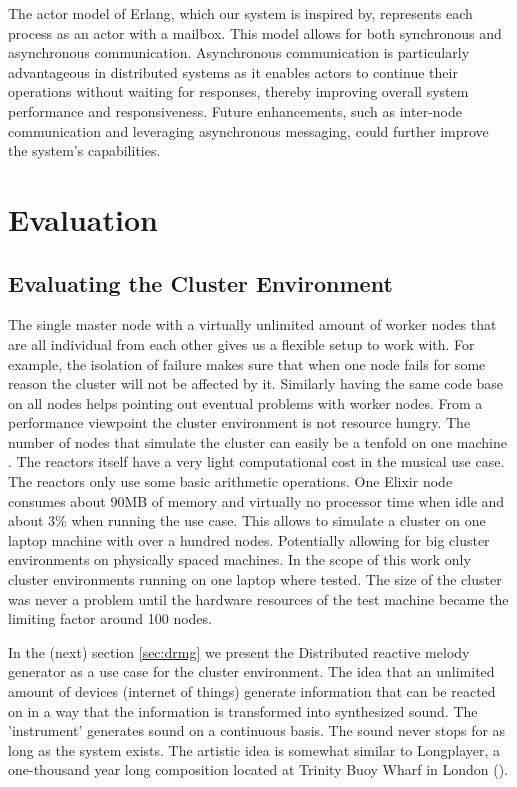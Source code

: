 \documentclass[a4paper]{book}
\begin{document}
The actor model of Erlang, which our system is inspired by, represents each process as an actor with a mailbox. This model allows for both synchronous and asynchronous communication. Asynchronous communication is particularly advantageous in distributed systems as it enables actors to continue their operations without waiting for responses, thereby improving overall system performance and responsiveness. Future enhancements, such as inter-node communication and leveraging asynchronous messaging, could further improve the system's capabilities.

\chapter{Evaluation} \label{sec:evaluation}


\section{Evaluating the Cluster Environment}

The single master node with a virtually unlimited amount of worker nodes that are all individual from each other gives us a flexible setup to work with. For example, the isolation of failure makes sure that when one node fails for some reason the cluster will not be affected by it. Similarly having the same code base on all nodes helps pointing out eventual problems with worker nodes. From a performance viewpoint the cluster environment is not resource hungry. The number of nodes that simulate the cluster can easily be a tenfold on one machine . The reactors itself have a very light computational cost in the musical use case. The reactors only use some basic arithmetic operations. One Elixir node consumes about 90MB of memory and virtually no processor time when idle and about 3\% when running the use case. This allows to simulate a cluster on one laptop machine with over a hundred nodes. Potentially allowing for big cluster environments on physically spaced machines. In the scope of this work only cluster environments running on one laptop where tested. The size of the cluster was never a problem until the hardware resources of the test machine became the limiting factor around 100 nodes.

In the (next) section \ref{sec:drmg} we present the Distributed reactive melody generator as a use case for the cluster environment. The idea that an unlimited amount of devices (internet of things) generate information that can be reacted on in a way that the information is transformed into synthesized sound. The 'instrument' generates sound on a continuous basis. The sound never stops for as long as the system exists. The artistic idea is somewhat similar to Longplayer, a one-thousand year long composition located at Trinity Buoy Wharf in London (\cite{Longplayer2024}). 
\end{document}
